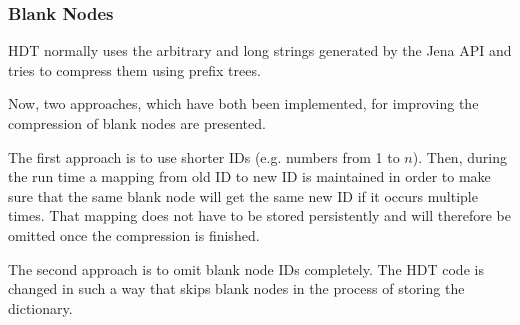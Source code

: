 \subsubsection{Blank Nodes}\label{sec:implementationBlankNodes}

HDT normally uses the arbitrary and long strings generated by the Jena API and tries to compress them using prefix trees.

Now, two approaches, which have both been implemented, for improving the compression of blank nodes are presented.

The first approach is to use shorter IDs (e.g. numbers from 1 to $n$). Then, during the run time a mapping from old ID to new ID is maintained in order to make sure that the same blank node will get the same new ID if it occurs multiple times. That mapping does not have to be stored persistently and will therefore be omitted once the compression is finished.

The second approach is to omit blank node IDs completely. The HDT code is changed in such a way that skips blank nodes in the process of storing the dictionary.

















